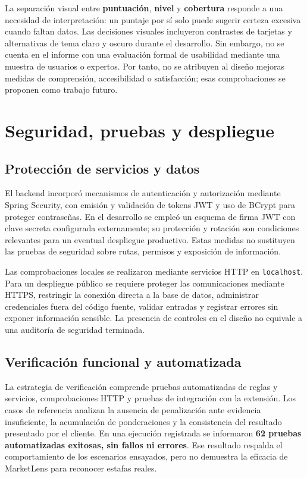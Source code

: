 La separación visual entre \textbf{puntuación}, \textbf{nivel} y \textbf{cobertura} responde a una necesidad de interpretación: un puntaje por sí solo puede sugerir certeza excesiva cuando faltan datos. Las decisiones visuales incluyeron contrastes de tarjetas y alternativas de tema claro y oscuro durante el desarrollo. Sin embargo, no se cuenta en el informe con una evaluación formal de usabilidad mediante una muestra de usuarios o expertos. Por tanto, no se atribuyen al diseño mejoras medidas de comprensión, accesibilidad o satisfacción; esas comprobaciones se proponen como trabajo futuro.

\section{Seguridad, pruebas y despliegue}\label{sec:ml-seguridad-calidad}

\subsection{Protección de servicios y datos}\label{subsec:ml-seguridad}

El backend incorporó mecanismos de autenticación y autorización mediante Spring Security, con emisión y validación de tokens JWT y uso de BCrypt para proteger contraseñas. En el desarrollo se empleó un esquema de firma JWT con clave secreta configurada externamente; su protección y rotación son condiciones relevantes para un eventual despliegue productivo. Estas medidas no sustituyen las pruebas de seguridad sobre rutas, permisos y exposición de información.

Las comprobaciones locales se realizaron mediante servicios HTTP en \texttt{localhost}. Para un despliegue público se requiere proteger las comunicaciones mediante HTTPS, restringir la conexión directa a la base de datos, administrar credenciales fuera del código fuente, validar entradas y registrar errores sin exponer información sensible. La presencia de controles en el diseño no equivale a una auditoría de seguridad terminada.

\subsection{Verificación funcional y automatizada}\label{subsec:ml-pruebas-calidad}

La estrategia de verificación comprende pruebas automatizadas de reglas y servicios, comprobaciones HTTP y pruebas de integración con la extensión. Los casos de referencia analizan la ausencia de penalización ante evidencia insuficiente, la acumulación de ponderaciones y la consistencia del resultado presentado por el cliente. En una ejecución registrada se informaron \textbf{62 pruebas automatizadas exitosas, sin fallos ni errores}. Ese resultado respalda el comportamiento de los escenarios ensayados, pero no demuestra la eficacia de MarketLens para reconocer estafas reales.

